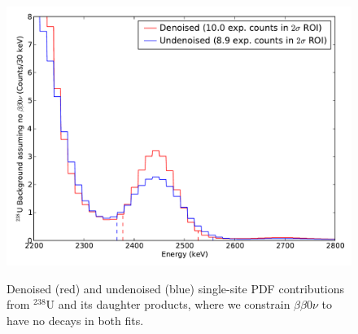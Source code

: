 \begin{figure}
\begin{center}
\includegraphics[keepaspectratio=true,width=\textwidth]{DenoisedVsUndenoised_SSPdf_UOnly.pdf}
\end{center}
\renewcommand{\baselinestretch}{1}
\small\normalsize
\begin{quote}
\caption{Denoised (red) and undenoised (blue) single-site PDF contributions from $^{238}$U and its daughter products, where we constrain $\beta\beta 0\nu$ to have no decays in both fits.}
\label{fig:DenoisedComparison_PdfComponentsU}
\end{quote}
\end{figure}
\renewcommand{\baselinestretch}{2}
\small\normalsize


